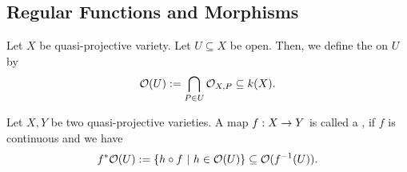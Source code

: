 \subsection{Regular Functions and Morphisms}
\begin{definition}
	Let $X$ be quasi-projective variety. Let $U \subseteq X$ be open. Then, we define the  on $U$ by
	\[ \mathcal{O}(U) := \bigcap_{P \in U}\mathcal{O}_{X,P} \subseteq k(X). \]
\end{definition}

\begin{definition}
	Let $X,Y$ be two quasi-projective varieties. A map $f:X\overset{}{\rightarrow} Y$ is called a , if $f$ is continuous and we have
	\[ f^*\mathcal{O}(U) := \left\lbrace h \circ f ~ | ~ h \in \mathcal{O}(U)\right\rbrace \subseteq \mathcal{O}(f^{-1}(U)). \]
\end{definition}